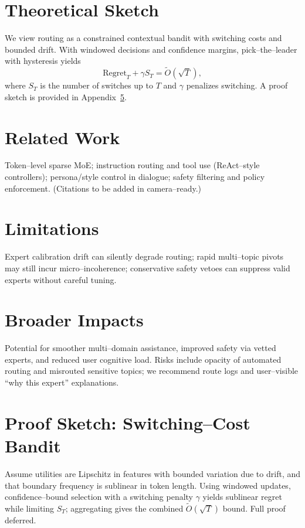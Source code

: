 \documentclass[11pt]{article}
\begin{document}
\section{Theoretical Sketch}
We view routing as a constrained contextual bandit with switching costs and bounded drift. With windowed decisions and confidence margins, pick--the--leader with hysteresis yields
\begin{equation}
\mathrm{Regret}_T + \gamma S_T = \tilde{O}\!\left(\sqrt{T}\right),
\end{equation}
where $S_T$ is the number of switches up to $T$ and $\gamma$ penalizes switching. A proof sketch is provided in Appendix~\ref{app:proof}.

\section{Related Work}
Token--level sparse MoE; instruction routing and tool use (ReAct--style controllers); persona/style control in dialogue; safety filtering and policy enforcement. (Citations to be added in camera--ready.)

\section{Limitations}
Expert calibration drift can silently degrade routing; rapid multi--topic pivots may still incur micro--incoherence; conservative safety vetoes can suppress valid experts without careful tuning.

\section{Broader Impacts}
Potential for smoother multi--domain assistance, improved safety via vetted experts, and reduced user cognitive load. Risks include opacity of automated routing and misrouted sensitive topics; we recommend route logs and user--visible “why this expert” explanations.

\appendix

\section{Proof Sketch: Switching--Cost Bandit}
\label{app:proof}
Assume utilities are Lipschitz in features with bounded variation due to drift, and that boundary frequency is sublinear in token length. Using windowed updates, confidence--bound selection with a switching penalty $\gamma$ yields sublinear regret while limiting $S_T$; aggregating gives the combined $\tilde{O}(\sqrt{T})$ bound. Full proof deferred.
\end{document}
